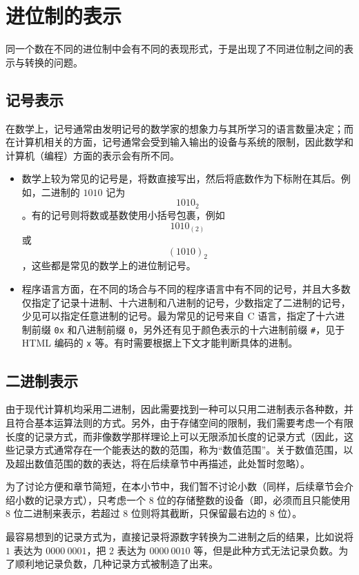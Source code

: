 \section{进位制的表示}\label{sec:ArithBasics/positional-notation-presentation}
    同一个数在不同的进位制中会有不同的表现形式，于是出现了不同进位制之间的表示与转换的问题。
    \subsection{记号表示}\label{subsec:ArithBasics/positional-notation-presentation/natural}
        在数学上，记号通常由发明记号的数学家的想象力与其所学习的语言数量决定；而在计算机相关的方面，记号通常会受到输入输出的设备与系统的限制，因此数学和计算机（编程）方面的表示会有所不同。
        \begin{itemize}
            \item 数学上较为常见的记号是，将数直接写出，然后将底数作为下标附在其后。例如，二进制的 $1010$ 记为\[1010_2\]。有的记号则将数或基数使用小括号包裹，例如\[1010_{(2)}\]或\[(1010)_2\]，这些都是常见的数学上的进位制记号。
            \item 程序语言方面，在不同的场合与不同的程序语言中有不同的记号，并且大多数仅指定了记录十进制、十六进制和八进制的记号，少数指定了二进制的记号，少见可以指定任意进制的记号。最为常见的记号来自 C 语言，指定了十六进制前缀 \texttt{0x} 和八进制前缀 \texttt{0}，另外还有见于颜色表示的十六进制前缀 \texttt{\#}，见于 HTML 编码的 \texttt{x} 等。有时需要根据上下文才能判断具体的进制。
        \end{itemize}
    \subsection{二进制表示}\label{subsec:ArithBasics/positional-notation-presentation/binary}
        由于现代计算机均采用二进制，因此需要找到一种可以只用二进制表示各种数，并且符合基本运算法则的方式。另外，由于存储空间的限制，我们需要考虑一个有限长度的记录方式，而非像数学那样理论上可以无限添加长度的记录方式（因此，这些记录方式通常存在一个能表达的数的范围，称为“数值范围”。关于数值范围，以及超出数值范围的数的表达，将在后续章节中再描述，此处暂时忽略）。

        为了讨论方便和章节简短，在本小节中，我们暂不讨论小数（同样，后续章节会介绍小数的记录方式），只考虑一个 $8$ 位的存储整数的设备（即，必须而且只能使用 $8$ 位二进制来表示，若超过 $8$ 位则将其截断，只保留最右边的 $8$ 位）。

        最容易想到的记录方式为，直接记录将源数字转换为二进制之后的结果，比如说将 $1$ 表达为 $0000\ 0001$，把 $2$ 表达为 $0000\ 0010$ 等，但是此种方式无法记录负数。为了顺利地记录负数，几种记录方式被制造了出来。


